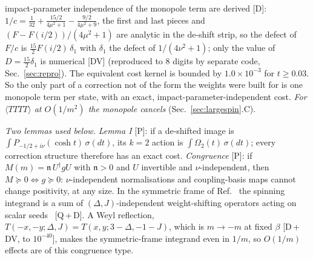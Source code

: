 \documentclass[aps,prl,onecolumn,superscriptaddress,nofootinbib]{revtex4-2}
\begin{document}
impact-parameter independence of the monopole term are derived [D]: $1/c=\tfrac1{32}+\tfrac{15/2}{4\mu^2+1}-\tfrac{9/2}{4\mu^2+9}$,
the first and last pieces and $(F-F(i/2))/(4\mu^2+1)$ are analytic in the de-shift strip, so the defect of $F/c$ is
$\tfrac{15}2F(i/2)\,\delta_1$ with $\delta_1$ the defect of $1/(4\nu^2+1)$; only the value of $D=\tfrac{15}{2}\delta_1$ is
numerical [DV] (reproduced to 8 digits by separate code, Sec.~\ref{sec:repro}). The equivalent cost kernel is bounded by $1.0\times10^{-3}$ for
$t\ge0.03$. So the only part of a correction not of the form the weights were built for is one monopole term per state,
with an exact, impact-parameter-independent cost. \emph{For $\langle TTTT\rangle$ at $O(1/m^2)$ the monopole cancels}
(Sec.~\ref{sec:largespin}.C).

\emph{Two lemmas used below.} \emph{Lemma I} [P]: if a de-shifted image is $\int P_{-1/2+i\nu}(\cosh t)\,\sigma(dt)$,
its $k=2$ action is $\int\Omega_2(t)\,\sigma(dt)$; every correction structure therefore has an exact cost. \emph{Congruence}
[P]: if $M(m)=\mathfrak n\,U^\dagger gU$ with $\mathfrak n>0$ and $U$ invertible and $\nu$-independent, then $M\succeq0\Leftrightarrow g\succeq0$:
$\nu$-independent normalisations and coupling-basis maps cannot change positivity, at any size. In the symmetric
frame of Ref.~\cite{CHMRS} the spinning integrand is a sum of $(\Delta,J)$-independent weight-shifting operators
acting on scalar seeds~\cite{CPPR} [Q\,+\,D]. A Weyl reflection,
$T(-x,-y;\Delta,J)=T(x,y;3-\Delta,-1-J)$, which is $m\to-m$ at fixed $\beta$ [D\,+\,DV, to $10^{-40}$], makes the
symmetric-frame integrand even in $1/m$, so $O(1/m)$ effects are of this congruence type.
\end{document}
